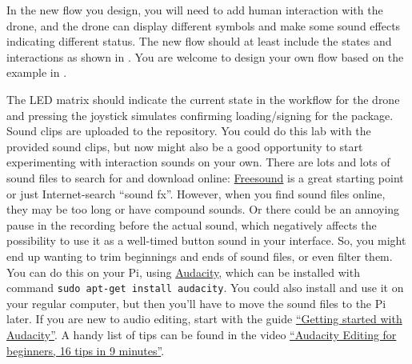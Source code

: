 \documentclass{article}
\begin{document}
In the new flow you design, you will need to add human interaction with the drone, and the drone can display different symbols and make some sound effects indicating different status. The new flow should at least include the states and interactions as shown in . You are welcome to design your own flow based on the example in .

    The LED matrix should indicate the current state in the workflow for the drone and pressing the joystick simulates confirming loading/signing for the package. Sound clips are uploaded to the repository. You could do this lab with the provided sound clips, but now might also be a good opportunity to start experimenting with interaction sounds on your own. There are lots and lots of sound files to search for and download online: \textcolor{blue}{\href{www.freesound.org}{Freesound}} is a great starting point or just Internet-search “sound fx”. However, when you find sound files online, they may be too long or have compound sounds. Or there could be an annoying pause in the recording before the actual sound, which negatively affects the possibility to use it as a well-timed button sound in your interface. So, you might end up wanting to trim beginnings and ends of sound files, or even filter them. You can do this on your Pi, using \textcolor{blue}{\href{https://www.audacityteam.org/}{Audacity}}, which can be installed with command \verb!sudo apt-get install audacity!. You could also install and use it on your regular computer, but then you’ll have to move the sound files to the Pi later. If you are new to audio editing, start with the guide \textcolor{blue}{\href{https://userguiding.com/blog/audacity-tutorial/}{“Getting started with Audacity”}}. A handy list of tips can be found in the video \textcolor{blue}{\href{https://www.youtube.com/watch?v=WWFvG1-AmNk}{“Audacity Editing for beginners, 16 tips in 9 minutes”}}. 
 
\end{document}
